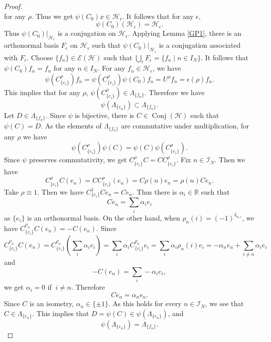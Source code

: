 \documentclass[11pt]{amsart}
\theoremstyle{remark}
\newcommand{\cH}{{\mathcal{H}}}
\newcommand{\Conj}{\operatorname{Conj}(\cH)}
\begin{document}
\begin{proof}
\[\]
for any $\rho$. Thus we get $\psi(C_0)x \in \cH_{\epsilon}$. It follows that for any $\epsilon$,
\[
\psi(C_0)(\cH_{\epsilon})=\cH_{\epsilon}.
\]
Thus $\psi(C_0)|_{\cH_{\epsilon}}$ is a conjugation on $\cH_{\epsilon}$. Applying Lemma \ref{GP1}, there is an orthonormal basis $F_{\epsilon}$ on $\cH_{\epsilon}$ such that $\psi(C_0)|_{\cH_{\epsilon}}$ is a conjugation associated with $F_{\epsilon}$. Choose $\{f_n\} \in \mathcal{E}(\cH)$ such that $\bigcup_{\epsilon}F_{\epsilon} =\{f_n \mid n \in I_N\} $. It follows that $\psi(C_0)f_n=f_n$ for any $n \in I_N$. For any $f_n \in \cH_{\epsilon}$, we have
\[
\psi(C_{\{e_i\}}^{\rho})f_n=\psi(C_{\{e_i\}}^{\rho})\psi(C_0)f_n=U^{\rho}f_n=\epsilon(\rho)f_n.
\]
This implies that for any $\rho$, $\psi(C_{\{e_i\}}^{\rho}) \in \Lambda_{\{f_n\}}$. Therefore we have
\[
\psi(\Lambda_{\{e_n\}}) \subset \Lambda_{\{f_n\}}.
\]
Let $D \in \Lambda_{\{f_n\}}$. Since $\psi$ is bijective, there is $C \in \Conj$ such that $\psi(C)=D$.  As the elements of $\Lambda_{\{f_n\}}$ are commutative under multiplication, for any $\rho$ we have
\[
\psi(C_{\{e_i\}}^{\rho})\psi(C)=\psi(C)\psi(C_{\{e_i\}}^{\rho}).
\]
Since $\psi$ preserves commutativity, we get $C_{\{e_i\}}^{\rho}C=CC_{\{e_i\}}^{\rho}$.
Fix $n \in \mathcal{I}_N$. Then we have 
\[
C_{\{e_i\}}^{\rho}C(e_n)=CC_{\{e_i\}}^{\rho}(e_n)=C\rho(n)e_n=\rho(n)Ce_n.
\]
Take $\rho \equiv1$. Then we have $C_{\{e_i\}}^{1}Ce_n=Ce_n$. Thus there is $\alpha_i \in \mathbb{R}$ such that
\[
Ce_n=\sum_{i}\alpha_i e_i
\]
as $\{e_i\}$ is an orthonormal basis. On the other hand, when $\rho_n(i)=(-1)^{\delta_{n,i}}$,  we have $C_{\{e_i\}}^{\rho_n}C(e_n)=-C(e_n)$. Since
\[
C_{\{e_i\}}^{\rho_n}C(e_n)=C_{\{e_i\}}^{\rho_n}(\sum_{i}\alpha_i e_i)=\sum_{i}\alpha_iC_{\{e_i\}}^{\rho_n} e_i=\sum_{i}\alpha_i\rho_n(i) e_i=-\alpha_n e_n+\sum_{i \neq n} \alpha_i e_i
\]
and
\[
-C(e_n)=\sum_{i}-\alpha_i e_i,
\]
we get  $\alpha_{i}=0$  if $\ i \neq n$. Therefore 
\[
Ce_n=\alpha_ne_n.
\]
Since $C$ is an isometry, $\alpha_n \in \{ \pm1\}$.
As this holds for every $n \in \mathcal{I}_N$, we see that $C \in \Lambda_{\{e_n\}}$. This implies that $D=\psi(C) \in \psi(\Lambda_{\{e_n\}})$, and 
\[
\psi(\Lambda_{\{e_n\}})=\Lambda_{\{f_n\}}.
\]
\end{proof}
\end{document}
